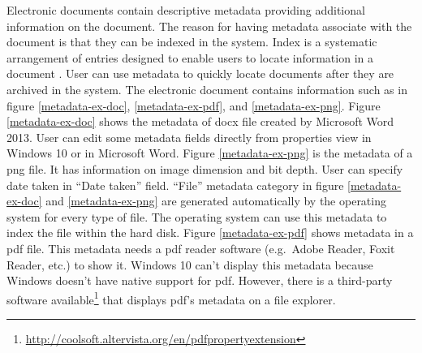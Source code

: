 Electronic documents contain descriptive metadata providing additional information on the document.
The reason for having metadata associate with the document is that they can be indexed in the system.
Index is a systematic arrangement of entries designed to enable users to locate information in a document \cite{def-index}.
User can use metadata to quickly locate documents after they are archived in the system.
The electronic document contains information such as in figure \ref{metadata-ex-doc}, \ref{metadata-ex-pdf}, and \ref{metadata-ex-png}.
Figure \ref{metadata-ex-doc} shows the metadata of docx file created by Microsoft Word 2013.
User can edit some metadata fields directly from properties view in Windows 10 or in Microsoft Word.
Figure \ref{metadata-ex-png} is the metadata of a \gls{png} file.
It has information on image dimension and bit depth.
User can specify date taken in \enquote{Date taken} field.
\enquote{File} metadata category in figure \ref{metadata-ex-doc} and \ref{metadata-ex-png} are generated automatically by the operating system for every type of file.
The operating system can use this metadata to index the file within the hard disk.
Figure \ref{metadata-ex-pdf} shows metadata in a \gls{pdf} file.
This metadata needs a \gls{pdf} reader software (e.g.\ Adobe Reader, Foxit Reader, etc.) to show it.
Windows 10 can't display this metadata because Windows doesn't have native support for \gls{pdf}.
However, there is a third-party software available\footnote{\url{http://coolsoft.altervista.org/en/pdfpropertyextension}} that displays \gls{pdf}'s metadata on a file explorer.
